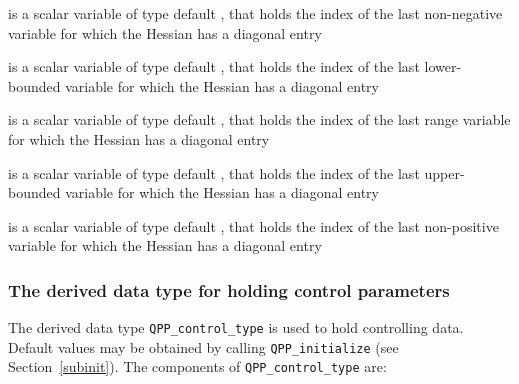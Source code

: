 \documentclass{galahad}
\newcommand{\packagename}{QPP}
\begin{document}
\begin{description}
 is a scalar variable of type default \integer,
that holds the index of the last non-negative variable for which
the Hessian has a diagonal entry

 is a scalar variable of type default \integer,
that holds the index of the last lower-bounded variable for which the Hessian
has a diagonal entry

 is a scalar variable of type default \integer,
that holds the index of the last range variable for which the Hessian has a
diagonal entry

 is a scalar variable of type default \integer,
that holds the index of the last upper-bounded variable for which the Hessian
has a diagonal entry

 is a scalar variable of type default \integer,
that holds the index of the last non-positive variable for which the Hessian
has a diagonal entry
\end{description}


\subsubsection{The derived data type for holding control
 parameters}\label{typecontrol}
The derived data type
{\tt \packagename\_control\_type}
is used to hold controlling data. Default values may be obtained by calling
{\tt \packagename\_initialize}
(see Section~\ref{subinit}). The components of
{\tt \packagename\_control\_type}
are:
\end{document}
